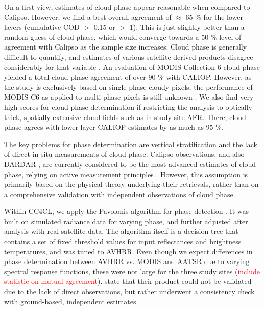 On a first view, estimates of cloud phase appear reasonable when compared to Calipso. However, we find a best overall agreement of $\approx$ 65 \% for the lower layers (cumulative COD $>$ 0.15 or $>$ 1). This is just slightly better than a random guess of cloud phase, which would converge towards a 50 \% level of agreement with Calipso as the sample size increases. Cloud phase is generally difficult to quantify, and estimates of various satellite derived products disagree considerably for that variable \citep{Stengel15}. An evaluation of MODIS Collection 6 cloud phase yielded a total cloud phase agreement of over 90 \% with CALIOP. However, as the study is exclusively based on single-phase cloudy pixels, the performance of MODIS C6 as applied to multi phase pixels is still unknown \citep{Marchant16}. We also find very high scores for cloud phase determination if restricting the analysis to optically thick, spatially extensive cloud fields such as in study site AFR. There, cloud phase agrees with lower layer CALIOP estimates by as much as 95 \%. 

The key problems for phase determination are vertical stratification and the lack of direct in-situ measurements of cloud phase. Calipso observations, and also DARDAR \citep{Ceccaldi13}, are currently considered to be the most advanced estimates of cloud phase, relying on active measurement principles \citep{Winker09,Karlsson10}. However, this assumption is primarily based on the physical theory underlying their retrievals, rather than on a comprehensive validation with independent observations of cloud phase. 

Within CC4CL, we apply the Pavolonis algorithm for phase detection \citep{Pavolonis05}. It was built on simulated radiance data for varying phase, and further adjusted after analysis with real satellite data. The algorithm itself is a decision tree that contains a set of fixed threshold values for input reflectances and brightness temperatures, and was tuned to AVHRR. Even though we expect differences in phase determination between AVHRR vs. MODIS and AATSR due to varying spectral response functions, these were not large for the three study sites (\textcolor{red}{include statistic on mutual agreement}). \citet{Pavolonis05} state that their product could not be validated due to the lack of direct observations, but rather underwent a consistency check with ground-based, independent estimates. 

